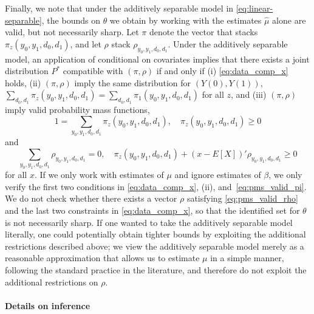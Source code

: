 \documentclass[12pt]{article}%
\theoremstyle{definition}
\newcommand\1{\operatorname{I}\indicatorfence}
\begin{document}
\begin{appendices}
Finally, we note that under the additively separable model in
\cref{eq:linear-separable}, the bounds on $\theta$ we obtain by working with the
estimates $\hat{\mu}$ alone are valid, but not necessarily sharp. Let $\pi$
denote the vector that stacks $\pi_{z}(y_{0}, y_{1}, d_{0}, d_{1})$, and let
$\rho$ stack $\rho_{y_{0}, y_{1}, d_{0}, d_{1}}$. Under the additively separable
model, an application of  conditional on covariates
implies that there exists a joint distribution $P^{*}$ compatible with
$(\pi, \rho)$ if and only if (i) \cref{eq:data_comp_x} holds, (ii)
$(\pi, \rho)$ imply the same distribution for $(Y(0), Y(1))$,
$\sum_{d_{0}, d_{1}}\pi_{z}(y_{0}, y_{1}, d_{0}, d_{1})
=\sum_{d_{0}, d_{1}}\pi_{1}(y_{0}, y_{1}, d_{0}, d_{1})$ for all $z$, and (iii) $(\pi, \rho)$
imply valid probability mass functions,
\begin{equation}\label{eq:pms_valid_pi}
  1= \sum_{y_{0}, y_{1}, d_{0}, d_{1}}\pi_{z}(y_{0}, y_{1}, d_{0}, d_{1}), \quad
  \pi_{z}(y_{0}, y_{1}, d_{0}, d_{1})\geq 0
\end{equation}
and
\begin{equation}\label{eq:pms_valid_rho}
  \sum_{y_{0}, y_{1}, d_{0}, d_{1}}\rho_{y_{0}, y_{1}, d_{0}, d_{1}}=0,\quad
  \pi_{z}(y_{0}, y_{1}, d_{0}, d_{1})+(x-E[X])'\rho_{y_{0}, y_{1}, d_{0}, d_{1}}\geq 0
\end{equation}
for all $x$. If we only work with estimates of $\mu$ and ignore estimates of
$\beta$, we only verify the first two conditions in
\cref{eq:data_comp_x}, (ii), and~\cref{eq:pms_valid_pi}. We do not check
whether there exists a vector $\rho$ satisfying \cref{eq:pms_valid_rho} and the
last two constraints in \cref{eq:data_comp_x}, so that the identified
set for $\theta$ is not necessarily sharp. If one wanted to take the additively separable model literally, one could potentially obtain tighter bounds by exploiting the additional restrictions described above; we view the additively
separable model merely as a reasonable approximation that allows us to estimate
$\mu$ in a simple manner, following the standard practice in the literature, and therefore do not exploit the additional restrictions on
$\rho$.

\paragraph{Details on inference}


\end{appendices}
\end{document}
